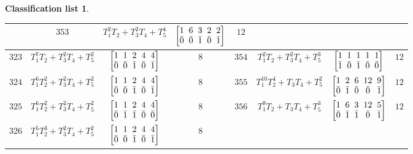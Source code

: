 \documentclass[10pt,a4paper]{amsart}
\theoremstyle{definition}
\newtheorem{class-list}[thm]{Classification list}
\numberwithin{equation}{section}
\begin{document}
\begin{class-list}
\begin{table}[h!]
\begin{tabu}{c|c|c|c||c|c|c|c}
&${353}$&${T_{1}^{2}T_{2}+T_{3}^{2}T_{4}+T_{5}^{4}}$
&$\arraycolsep=1mm\begin{bmatrix}{1} & {6} & {3} & {2} & {2} \\ {\bar{0}} & {\bar{0}} & {\bar{1}} & {\bar{0}} & {\bar{1}}\end{bmatrix}$&${12}$
\\
\hline
${323}$&${T_{1}^{7}T_{2}+T_{3}^{2}T_{4}+T_{5}^{2}}$
&$\arraycolsep=1mm\begin{bmatrix}{1} & {1} & {2} & {4} & {4} \\ {\bar{0}} & {\bar{0}} & {\bar{1}} & {\bar{0}} & {\bar{1}}\end{bmatrix}$&${8}$
&${354}$&${T_{1}^{2}T_{2}+T_{3}^{2}T_{4}+T_{5}^{3}}$
&$\arraycolsep=1mm\begin{bmatrix}{1} & {1} & {1} & {1} & {1} \\ {\bar{1}} & {\bar{0}} & {\bar{1}} & {\bar{0}} & {\bar{0}}\end{bmatrix}$&${12}$
\\
\hline
${324}$&${T_{1}^{6}T_{2}^{2}+T_{3}^{2}T_{4}+T_{5}^{2}}$
&$\arraycolsep=1mm\begin{bmatrix}{1} & {1} & {2} & {4} & {4} \\ {\bar{0}} & {\bar{0}} & {\bar{1}} & {\bar{0}} & {\bar{1}}\end{bmatrix}$&${8}$
&${355}$&${T_{1}^{10}T_{2}^{4}+T_{3}T_{4}+T_{5}^{2}}$
&$\arraycolsep=1mm\begin{bmatrix}{1} & {2} & {6} & {12} & {9} \\ {\bar{0}} & {\bar{1}} & {\bar{0}} & {\bar{0}} & {\bar{1}}\end{bmatrix}$&${12}$
\\
\hline
${325}$&${T_{1}^{6}T_{2}^{2}+T_{3}^{2}T_{4}+T_{5}^{2}}$
&$\arraycolsep=1mm\begin{bmatrix}{1} & {1} & {2} & {4} & {4} \\ {\bar{0}} & {\bar{1}} & {\bar{1}} & {\bar{0}} & {\bar{0}}\end{bmatrix}$&${8}$
&${356}$&${T_{1}^{9}T_{2}+T_{3}T_{4}+T_{5}^{3}}$
&$\arraycolsep=1mm\begin{bmatrix}{1} & {6} & {3} & {12} & {5} \\ {\bar{0}} & {\bar{1}} & {\bar{1}} & {\bar{0}} & {\bar{1}}\end{bmatrix}$&${12}$
\\
\hline
${326}$&${T_{1}^{5}T_{2}^{3}+T_{3}^{2}T_{4}+T_{5}^{2}}$
&$\arraycolsep=1mm\begin{bmatrix}{1} & {1} & {2} & {4} & {4} \\ {\bar{0}} & {\bar{0}} & {\bar{1}} & {\bar{0}} & {\bar{1}}\end{bmatrix}$&${8}$

\end{tabu}
\end{table}
\end{class-list}
\end{document}
